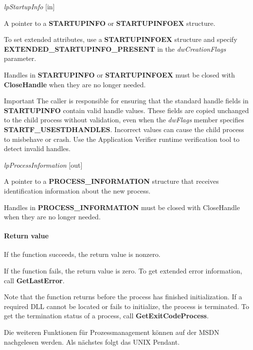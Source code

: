 \documentclass[a4paper]{book}
\newenvironment{customindent}[1]
{\begin{list}{}
	{\setlength{\leftmargin}{#1}}
    	\item[]
    }
{\end{list}}
\begin{document}
\noindent \textit{lpStartupInfo} [in]
\begin{customindent}{1cm}
    A pointer to a \textbf{STARTUPINFO} or \textbf{STARTUPINFOEX} structure.

    To set extended attributes, use a \textbf{STARTUPINFOEX} structure and specify \textbf{EXTENDED\_STARTUPINFO\_PRESENT} in the \textit{dwCreationFlags} parameter.

    Handles in \textbf{STARTUPINFO} or \textbf{STARTUPINFOEX} must be closed with \textbf{CloseHandle} when they are no longer needed.

    Important  The caller is responsible for ensuring that the standard handle fields in \textbf{STARTUPINFO} contain valid handle values. These fields are copied unchanged to the child process without validation, even when the \textit{dwFlags} member specifies \textbf{STARTF\_USESTDHANDLES}. Incorrect values can cause the child process to misbehave or crash. Use the Application Verifier runtime verification tool to detect invalid handles.
\end{customindent}

\noindent \textit{lpProcessInformation} [out]
\begin{customindent}{1cm}
    A pointer to a \textbf{PROCESS\_INFORMATION} structure that receives identification information about the new process.

    Handles in \textbf{PROCESS\_INFORMATION} must be closed with CloseHandle when they are no longer needed.
\end{customindent}

\paragraph{Return value}
\begin{customindent}{1cm}
	If the function succeeds, the return value is nonzero.

	If the function fails, the return value is zero. To get extended error information, call \textbf{GetLastError}.

	Note that the function returns before the process has finished initialization. If a required DLL cannot be located or fails to initialize, the process is terminated. To get the termination status of a process, call \newline\textbf{GetExitCodeProcess}.
\end{customindent}

\noindent Die weiteren Funktionen für Prozessmanagement können auf der MSDN nachgelesen werden. Als nächstes folgt das UNIX Pendant.
\end{document}
